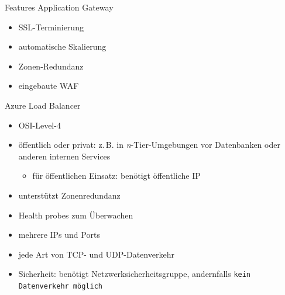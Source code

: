 \begin{flashcard}[]{Features Application Gateway}
  \begin{itemize}
    \item SSL-Terminierung
    \item automatische Skalierung
    \item Zonen-Redundanz
    \item eingebaute WAF
  \end{itemize}
\end{flashcard}

\begin{flashcard}[]{Azure Load Balancer}
  \begin{itemize}
    \item OSI-Level-4
    \item öffentlich oder privat: z.\,B. in \textit{n}-Tier-Umgebungen\newline
      vor Datenbanken oder anderen internen Services
      \begin{itemize}
        \item für öffentlichen Einsatz: benötigt öffentliche IP
      \end{itemize}
    \item unterstützt Zonenredundanz
    \item Health probes zum Überwachen
    \item mehrere IPs und Ports
    \item jede Art von TCP- und UDP-Datenverkehr
    \item Sicherheit: benötigt Netzwerksicherheitsgruppe, andernfalls\newline
      \texttt{kein Datenverkehr möglich}
  \end{itemize}
\end{flashcard}
